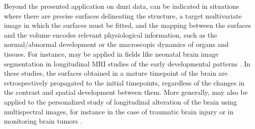 
Beyond the presented application on \gls*{dmri} data, \regseg{} can be indicated in situations
  where there are precise surfaces delineating the structure, a target multivariate
  image in which the surfaces must be fitted, and the mapping between the surfaces and
  the volume encodes relevant physiological information, such as the normal/abnormal
  development or the macroscopic dynamics of organs and tissues.
For instance, \regseg{} may be applied in fields like neonatal brain image segmentation
  in longitudinal MRI studies of the early developmental patterns \citep{shi_neonatal_2010}.
In these studies, the surfaces obtained in a mature timepoint of the brain are retrospectively
  propagated to the initial timepoints, regardless of the changes in the contrast and spatial
  development between them.
More generally, \regseg{} may also be applied to the personalized study of longitudinal alteration
  of the brain using multispectral images, for instance in the case of traumatic brain
  injury \citep{irimia_structural_2014} or in monitoring brain tumors
  \citep{weizman_semiautomatic_2014}.